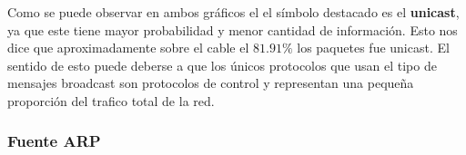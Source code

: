 \begin{figure}
	\begin{minipage}[b]{0.9\linewidth}
	\end{minipage}
\end{figure}


Como se puede observar en ambos gráficos el el símbolo destacado es el
\textbf{unicast}, ya que este tiene mayor probabilidad y menor cantidad de
información. Esto nos dice que aproximadamente sobre el cable el $81.91\%$ los
paquetes fue unicast.  El sentido de esto puede deberse a que los únicos
protocolos que usan el tipo de mensajes broadcast son protocolos de control y
representan una pequeña proporción del trafico total de la red.

\clearpage

\subsubsection{Fuente ARP}

